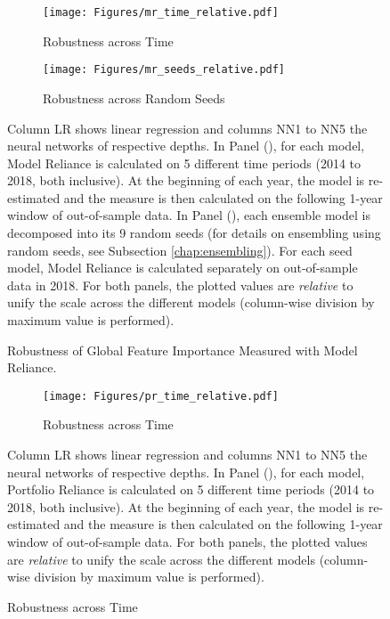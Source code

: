 	\begin{figure}	
		\centering		
		\begin{subfigure}[t]{\textwidth}
			\texttt{[image: Figures/mr\_time\_relative.pdf]}
			\caption{Robustness across Time}
			\label{fig:mr_time_relative}
		\end{subfigure}
		
		\begin{subfigure}[t]{\textwidth}
			\centering
			\texttt{[image: Figures/mr\_seeds\_relative.pdf]}
			\caption{Robustness across Random Seeds}
			\label{fig:mr_seeds_relative}
		\end{subfigure}
		\caption{Robustness of Global Feature Importance Measured with Model Reliance.}
		\medskip
		\small
		Column LR shows linear regression and columns NN1 to NN5 the neural networks of respective depths. In Panel (), for each model, Model Reliance is calculated on 5 different time periods (2014 to 2018, both inclusive). At the beginning of each year, the model is re-estimated and the measure is then calculated on the following 1-year window of out-of-sample data. In Panel (), each ensemble model is decomposed into its 9 random seeds (for details on ensembling using random seeds, see Subsection \ref{chap:ensembling}). For each seed model,  Model Reliance is calculated separately on out-of-sample data in 2018. For both panels, the plotted values are \textit{relative} to unify the scale across the different models (column-wise division by maximum value is performed).
		\label{fig:mr_robustness}
	\end{figure}
		
	\begin{figure}	
		\centering		
		\begin{subfigure}[t]{\textwidth}
			\texttt{[image: Figures/pr\_time\_relative.pdf]}
			\caption{Robustness across Time}
			\label{fig:pr_time_relative}
		\end{subfigure}
		
		Column LR shows linear regression and columns NN1 to NN5 the neural networks of respective depths. In Panel (), for each model, Portfolio Reliance is calculated on 5 different time periods (2014 to 2018, both inclusive). At the beginning of each year, the model is re-estimated and the measure is then calculated on the following 1-year window of out-of-sample data. For both panels, the plotted values are \textit{relative} to unify the scale across the different models (column-wise division by maximum value is performed).
		\label{fig:pr_robustness}
	\end{figure}
	
